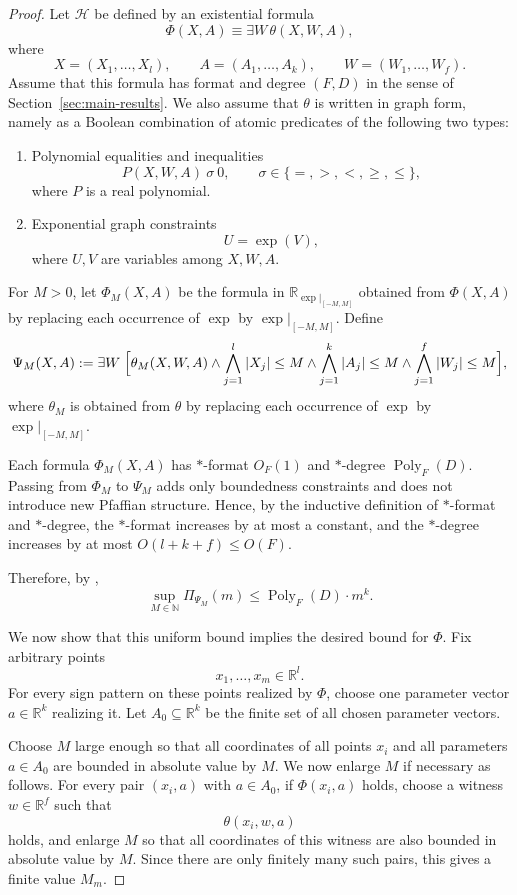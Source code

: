 \documentclass[11pt]{article}
\theoremstyle{plain}
\theoremstyle{definition}
\theoremstyle{remark}
\newcommand{\R}{\mathbb{R}}
\newcommand{\N}{\mathbb{N}}
\newcommand{\cH}{\mathcal{H}}
\newcommand{\Poly}{\operatorname{Poly}}
\begin{document}
\begin{proof}
Let \(\cH\) be defined by an existential formula
\[
  \Phi(X,A) \equiv \exists W\,\theta(X,W,A),
\]
where
\[
  X=(X_1,\ldots,X_l),\qquad
  A=(A_1,\ldots,A_k),\qquad
  W=(W_1,\ldots,W_f).
\]
Assume that this formula has format and degree \((F,D)\) in the sense of
Section~\ref{sec:main-results}. We also assume that \(\theta\) is written in
graph form, namely as a Boolean combination of atomic predicates of the following
two types:
\begin{enumerate}
    \item Polynomial equalities and inequalities
    \[
      P(X,W,A)\ \sigma\ 0,
      \qquad
      \sigma\in\{=,>,<,\ge,\le\},
    \]
    where \(P\) is a real polynomial.

    \item Exponential graph constraints
    \[
      U=\exp(V),
    \]
    where \(U,V\) are variables among \(X,W,A\).
\end{enumerate}

For \(M>0\), let \(\Phi_M(X,A)\) be the formula in
\(\R_{\exp|_{[-M,M]}}\) obtained from \(\Phi(X,A)\) by replacing each
occurrence of \(\exp\) by \(\exp|_{[-M,M]}\). Define
\[
  \Psi_M(X,A)
  :=
  \exists W\;
  \Bigl[
  \theta_M(X,W,A)
  \wedge
  \bigwedge_{j=1}^l |X_j|\le M
  \wedge
  \bigwedge_{j=1}^k |A_j|\le M
  \wedge
  \bigwedge_{j=1}^f |W_j|\le M
  \Bigr],
\]
where \(\theta_M\) is obtained from \(\theta\) by replacing each occurrence
of \(\exp\) by \(\exp|_{[-M,M]}\).

Each formula \(\Phi_M(X,A)\) has \(*\)-format \(O_F(1)\) and \(*\)-degree
\(\Poly_F(D)\). Passing from \(\Phi_M\) to \(\Psi_M\) adds only boundedness
constraints and does not introduce new Pfaffian structure. Hence, by the
inductive definition of \(*\)-format and \(*\)-degree, the \(*\)-format
increases by at most a constant, and the \(*\)-degree increases by at most
\(O(l+k+f)\le O(F)\).

Therefore, by ,
\[
  \sup_{M\in\N} \Pi_{\Psi_M}(m)
  \le
  \Poly_F(D)\cdot m^k .
\]

We now show that this uniform bound implies the desired bound for \(\Phi\).
Fix arbitrary points
\[
  x_1,\ldots,x_m\in\R^l .
\]
For every sign pattern on these points realized by \(\Phi\), choose one
parameter vector \(a\in\R^k\) realizing it. Let \(A_0\subseteq\R^k\) be the
finite set of all chosen parameter vectors.

Choose \(M\) large enough so that all coordinates of all points \(x_i\) and all
parameters \(a\in A_0\) are bounded in absolute value by \(M\). We now enlarge
\(M\) if necessary as follows. For every pair \((x_i,a)\) with \(a\in A_0\), if
\(\Phi(x_i,a)\) holds, choose a witness \(w\in\R^f\) such that
\[
  \theta(x_i,w,a)
\]
holds, and enlarge \(M\) so that all coordinates of this witness are also
bounded in absolute value by \(M\). Since there are only finitely many such
pairs, this gives a finite value \(M_m\).


\end{proof}
\end{document}
